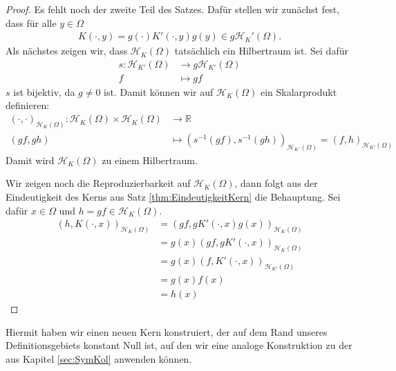 \begin{proof}
Es fehlt noch der zweite Teil des Satzes. Dafür stellen wir zunächst fest, dass für alle $y \in \Omega$
\begin{align*}
K(\cdot,y) = g(\cdot) K'(\cdot,y) g(y) \in g \mathcal{H}_K' (\Omega).
\end{align*}
Als nächstes zeigen wir, dass $\mathcal{H}_K(\Omega)$ tatsächlich ein Hilbertraum ist. Sei dafür
\begin{align*}
s : \mathcal{H}_{K'} (\Omega) &\rightarrow g\mathcal{H}_{K'} (\Omega)\\
f &\mapsto gf
\end{align*}
$s$ ist bijektiv, da $g \neq 0$ ist. Damit können wir auf $\mathcal{H}_K (\Omega)$ ein Skalarprodukt definieren:
\begin{align*}
\left(\cdot, \cdot \right)_{\mathcal{H}_K(\Omega)} : \mathcal{H}_K(\Omega) \times \mathcal{H}_K(\Omega) &\rightarrow \mathbb{R}\\
(gf, gh) &\mapsto \left(s^{-1}(gf), s^{-1}(gh)\right)_{\mathcal{H}_{K'}(\Omega)} = \left( f,h \right)_{\mathcal{H}_{K'}(\Omega)}
\end{align*}
Damit wird $\mathcal{H}_K(\Omega)$ zu einem Hilbertraum. 

Wir zeigen noch die Reproduzierbarkeit auf $\mathcal{H}_K(\Omega)$, dann folgt aus der Eindeutigkeit des Kerns aus Satz \ref{thm:EindeutigkeitKern} die Behauptung. Sei dafür $x \in \Omega$ und $h = gf \in \mathcal{H}_K (\Omega)$.
\begin{align*}
\left(h, K(\cdot,x) \right)_{\mathcal{H}_K(\Omega)} &= \left(gf, gK'(\cdot, x) g(x)\right)_{\mathcal{H}_K(\Omega)}\\
&= g(x) \left( gf, gK'(\cdot, x)\right)_{\mathcal{H}_K(\Omega)}\\
&= g(x) \left( f, K'(\cdot, x)\right)_{\mathcal{H}_{K'}(\Omega)}\\
&= g(x) f(x)\\
&= h(x)
\end{align*}
\end{proof}

Hiermit haben wir einen neuen Kern konstruiert, der auf dem Rand unseres Definitionsgebiets konstant Null ist, auf den wir eine analoge Konstruktion zu der aus Kapitel \ref{sec:SymKol} anwenden können.

